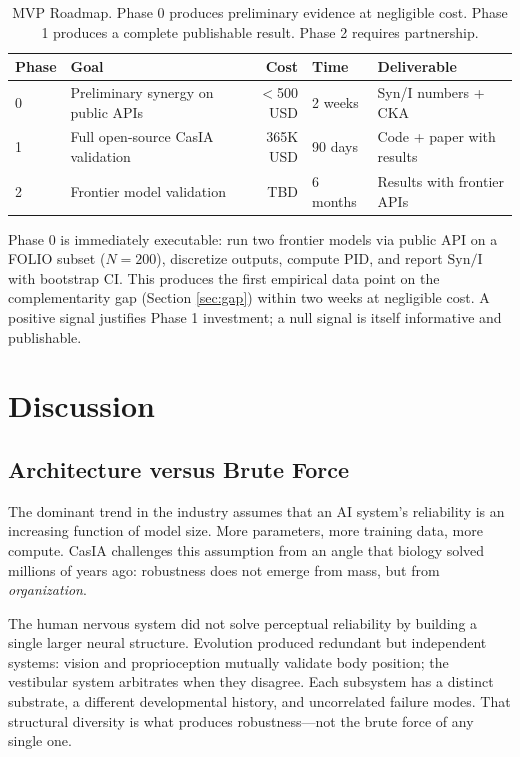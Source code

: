 \documentclass[11pt,a4paper]{article}
\theoremstyle{remark}
\newcommand{\Syn}{\mathrm{Syn}}
\newcommand{\MI}{\mathrm{I}}
\begin{document}
\begin{table}[H]
\centering
\begin{tabular}{@{}llrll@{}}
\toprule
\textbf{Phase} & \textbf{Goal} & \textbf{Cost} & \textbf{Time} & \textbf{Deliverable} \\
\midrule
0 & Preliminary synergy on public APIs & $<$500 USD & 2 weeks & Syn/I numbers + CKA \\
1 & Full open-source CasIA validation & 365K USD & 90 days & Code + paper with results \\
2 & Frontier model validation & TBD & 6 months & Results with frontier APIs \\
\bottomrule
\end{tabular}
\caption{MVP Roadmap. Phase 0 produces preliminary evidence at negligible cost. Phase 1 produces a complete publishable result. Phase 2 requires partnership.}
\label{tab:roadmap}
\end{table}

Phase 0 is immediately executable: run two frontier models via public API on a FOLIO subset ($N = 200$), discretize outputs, compute PID, and report $\Syn/\MI$ with bootstrap CI. This produces the first empirical data point on the complementarity gap (Section \ref{sec:gap}) within two weeks at negligible cost. A positive signal justifies Phase 1 investment; a null signal is itself informative and publishable.

\section{Discussion}
\label{sec:discussion}

\subsection{Architecture versus Brute Force}

The dominant trend in the industry assumes that an AI system's reliability is an increasing function of model size. More parameters, more training data, more compute. CasIA challenges this assumption from an angle that biology solved millions of years ago: robustness does not emerge from mass, but from \emph{organization}.

The human nervous system did not solve perceptual reliability by building a single larger neural structure. Evolution produced redundant but independent systems: vision and proprioception mutually validate body position; the vestibular system arbitrates when they disagree. Each subsystem has a distinct substrate, a different developmental history, and uncorrelated failure modes. That structural diversity is what produces robustness---not the brute force of any single one.
\end{document}

